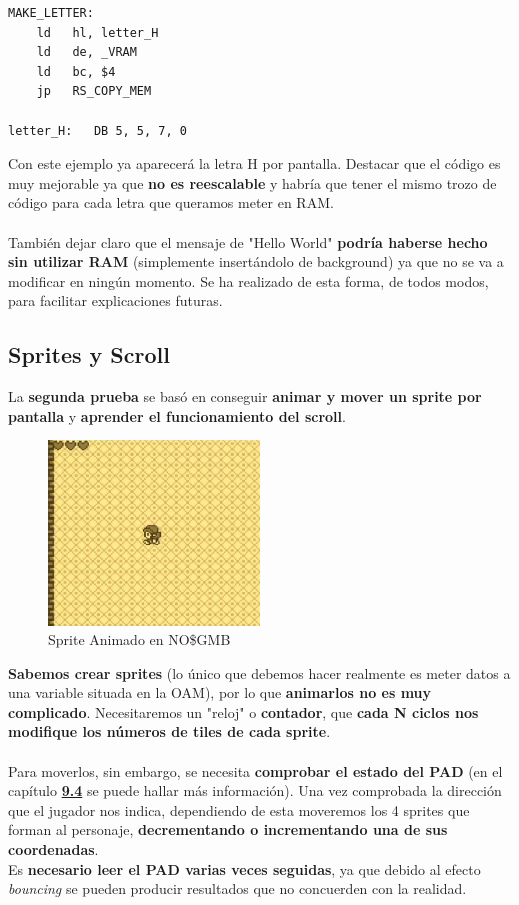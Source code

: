 \begin{lstlisting}[caption={Inserción de un Sprite a la OAM}, label={code:spr_oam}]
MAKE_LETTER:
	ld 	 hl, letter_H
	ld 	 de, _VRAM
	ld 	 bc, $4
	jp 	 RS_COPY_MEM

letter_H: 	DB 5, 5, 7, 0

\end{lstlisting}

Con este ejemplo ya aparecerá la letra H por pantalla. Destacar que el código es muy mejorable ya que \textbf{no es reescalable} y habría que tener el mismo trozo de código para cada letra que queramos meter en RAM.
\\ \\
También dejar claro que el mensaje de "Hello World" \textbf{podría haberse hecho sin utilizar RAM} (simplemente insertándolo de background) ya que no se va a modificar en ningún momento. Se ha realizado de esta forma, de todos modos, para facilitar explicaciones futuras.

\subsection{Sprites y Scroll}

La \textbf{segunda prueba} se basó en conseguir \textbf{animar y mover un sprite por pantalla} y \textbf{aprender el funcionamiento del scroll}.

\begin{figure}[h]
\centering
\includegraphics[width=0.5\textwidth]{include/images/desarrollo/sprite_scroll.png}
\caption{Sprite Animado en NO\$GMB}
\label{figure:sprite_scroll}
\end{figure}

\textbf{Sabemos crear sprites} (lo único que debemos hacer realmente es meter datos a una variable situada en la OAM), por lo que \textbf{animarlos no es muy complicado}. Necesitaremos un "reloj" o \textbf{contador}, que \textbf{cada N ciclos nos modifique los números de tiles de cada sprite}.
\\ \\
Para moverlos, sin embargo, se necesita \textbf{comprobar el estado del PAD} (en el capítulo \textbf{\hyperref[anexo_input]{9.4}} se puede hallar más información). Una vez comprobada la dirección que el jugador nos indica, dependiendo de esta moveremos los 4 sprites que forman al personaje, \textbf{decrementando o incrementando una de sus coordenadas}.
\\
Es \textbf{necesario leer el PAD varias veces seguidas}, ya que debido al efecto \textit{bouncing} se pueden producir resultados que no concuerden con la realidad.

